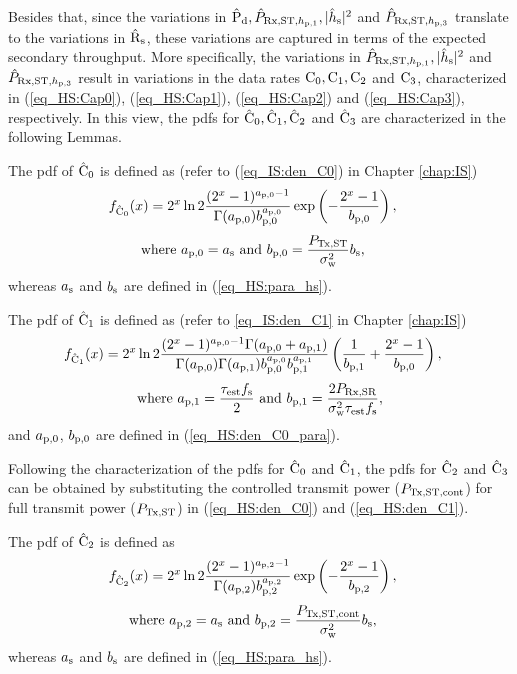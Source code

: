 Besides that, since the variations in $\hat{\text{P}}_{\text{d}}, \hat{P}_{\text{Rx,ST,$h_{\text{p,1}}$}}, |\hat{h}_{\text{s}}|^2$ and $\hat{P}_{\text{Rx,ST,$h_{\text{p,3}}$}}$ translate to the variations in $\hat{\text{{R}}}_{\text{s}}$, these variations are captured in terms of the expected secondary throughput. More specifically, the variations in $\hat{P}_{\text{Rx,ST,$h_{\text{p,1}}$}}, |\hat{h}_{\text{s}}|^2$ and $\hat{P}_{\text{Rx,ST,$h_{\text{p,3}}$}}$ result in variations in the data rates $\text{C}_{\text{0}}, \text{C}_{\text{1}}, \text{C}_{\text{2}}$ and $\text{C}_{\text{3}}$, characterized in (\ref{eq_HS:Cap0}), (\ref{eq_HS:Cap1}), (\ref{eq_HS:Cap2}) and (\ref{eq_HS:Cap3}), respectively. In this view, the pdfs for $\hat{\text{C}}_{\text{0}}, \hat{\text{C}}_{\text{1}}, \hat{\text{C}}_{\text{2}}$ and $\hat{\text{C}}_{\text{3}}$ are characterized in the following Lemmas.
\begin{lemma} \label{lm_HS:lem3}
\normalfont
The pdf of $\hat{\text{C}}_{\text{0}}$ is defined as (refer to (\ref{eq_IS:den_C0}) in Chapter \ref{chap:IS}) 
\begin{align}
f_{\hat{\text{C}}_{\text{0}}}(x) &= 2^x \ln 2 \frac{(2^x - 1)^{a_{\text{p,0}} - 1}}{\Gamma(a_{\text{p,0}}) b_{\text{p,0}}^{a_{\text{p,0}}}} \exp\left(-\frac{2^x - 1}{b_{\text{p,0}}}\right),  \label{eq_HS:den_C0}
\end{align}
\begin{align}
\text{where  } a_{\text{p,0}} = a_{\text{s}} &\text{ and } b_{\text{p,0}} = \frac{P_{\text{Tx,ST}}}{\sigma^2_{\text{w}}} b_{\text{s}},  \label{eq_HS:den_C0_para} 
\end{align}
whereas $a_{\text{s}}$ and $b_{\text{s}}$ are defined in (\ref{eq_HS:para_hs}).
\end{lemma}

\begin{lemma} \label{lm_HS:lem4} 
\normalfont
The pdf of $\hat{\text{C}}_{\text{1}}$ is defined as (refer to \ref{eq_IS:den_C1} in Chapter \ref{chap:IS})  
\begin{align}
f_{\hat{\text{C}}_{\text{1}}}(x) &= 2^x \ln 2 \frac{(2^x - 1)^{a_{\text{p,0}} - 1} \Gamma(a_{\text{p,0}} + a_{\text{p,1}})}{\Gamma(a_{\text{p,0}}) \Gamma(a_{\text{p,1}}) b_{\text{p,0}}^{a_{\text{p,0}}} b_{\text{p,1}}^{a_{\text{p,1}}}} \left(\frac{1}{b_{\text{p,1}}} + \frac{2^x - 1}{b_{\text{p,0}}}\right), \label{eq_HS:den_C1}
\end{align}
\begin{align}
\text{where  } a_{\text{p,1}} = \frac{\tau_{\text{est}} f_{\text{s}}}{2}  \text{  and  } b_{\text{p,1}} = \frac{2 P_{\text{Rx,SR}}}{\sigma^2_{\text{w}} \tau_{\text{est}} f_{\text{s}}}, \label{eq_HS:den_C1_para} 
\end{align}
and $a_{\text{p,0}}$, $b_{\text{p,0}}$ are defined in (\ref{eq_HS:den_C0_para}).
\end{lemma}
Following the characterization of the pdfs for $\hat{\text{C}}_{\text{0}}$ and $\hat{\text{C}}_{\text{1}}$, the pdfs for $\hat{\text{C}}_{\text{2}}$ and $\hat{\text{C}}_{\text{3}}$ can be obtained by substituting the controlled transmit power ($P_{\text{Tx,ST,cont}}$) for full transmit power ($P_{\text{Tx,ST}}$) in (\ref{eq_HS:den_C0}) and (\ref{eq_HS:den_C1}).
\begin{lemma} \label{lm_HS:lem5}
\normalfont
The pdf of $\hat{\text{C}}_{\text{2}}$ is defined as
\begin{align}
f_{\hat{\text{C}}_{\text{2}}}(x) &= 2^x \ln 2 \frac{(2^x - 1)^{a_{\text{p,2}} - 1}}{\Gamma(a_{\text{p,2}}) b_{\text{p,2}}^{a_{\text{p,2}}}} \exp\left(-\frac{2^x - 1}{b_{\text{p,2}}}\right),  \label{eq_HS:den_C2}
\end{align}
\begin{align}
\text{where  } a_{\text{p,2}} = a_{\text{s}} &\text{ and } b_{\text{p,2}} = \frac{P_{\text{Tx,ST,cont}}}{\sigma^2_{\text{w}}} b_{\text{s}},  \label{eq_HS:den_C2_para} 
\end{align}
whereas $a_{\text{s}}$ and $b_{\text{s}}$ are defined in (\ref{eq_HS:para_hs}).
\end{lemma}

